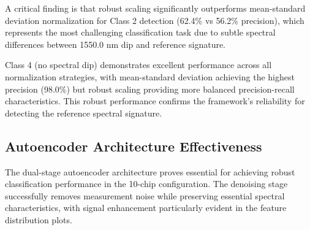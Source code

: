 \begin{table}[htbp]
\centering
\caption{Classification Performance Comparison Across Different Normalization Methods (10-chip)}
\label{tab:performance_comparison}
\end{table}

A critical finding is that robust scaling significantly outperforms mean-standard deviation normalization for Class 2 detection (62.4\% vs 56.2\% precision), which represents the most challenging classification task due to subtle spectral differences between 1550.0 nm dip and reference signature.

Class 4 (no spectral dip) demonstrates excellent performance across all normalization strategies, with mean-standard deviation achieving the highest precision (98.0\%) but robust scaling providing more balanced precision-recall characteristics. This robust performance confirms the framework's reliability for detecting the reference spectral signature.

\subsection{Autoencoder Architecture Effectiveness}

The dual-stage autoencoder architecture proves essential for achieving robust classification performance in the 10-chip configuration. The denoising stage successfully removes measurement noise while preserving essential spectral characteristics, with signal enhancement particularly evident in the feature distribution plots.

